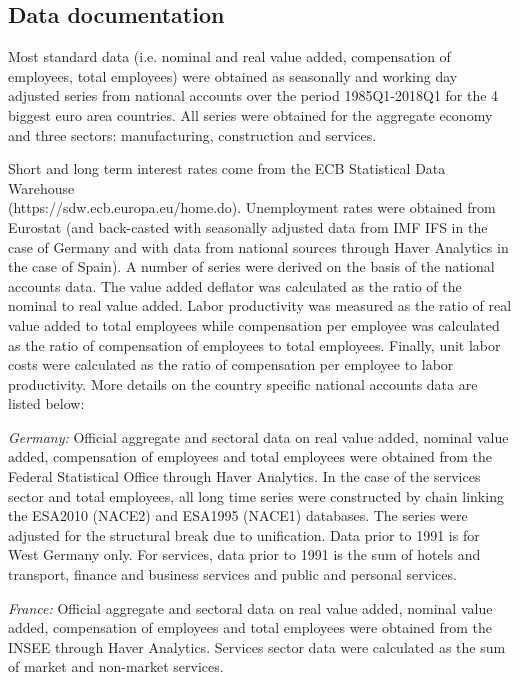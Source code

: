 \documentclass[11pt]{article}
\begin{document}
\begin{appendices}
\section{Data documentation} \label{DataAnnex}
Most standard data (i.e. nominal and real value added, compensation of employees, total employees) were obtained as seasonally and working day adjusted series from national accounts over the period 1985Q1-2018Q1 for the 4 biggest euro area countries. All series were obtained for the aggregate economy and three sectors: manufacturing, construction and services.

Short and long term interest rates come from the ECB Statistical Data Warehouse \\ (https://sdw.ecb.europa.eu/home.do). Unemployment rates were obtained from Eurostat (and back-casted with seasonally adjusted data from IMF IFS in the case of Germany and with data from national sources through Haver Analytics in the case of Spain). A number of series were derived on the basis of the national accounts data. The value added deflator was calculated as the ratio of the nominal to real value added. Labor productivity was measured as the ratio of real value added to total employees while compensation per employee was calculated as the ratio of compensation of employees to total employees.  Finally, unit labor costs were calculated as the ratio of compensation per employee to labor productivity. More details on the country specific national accounts data are listed below:

\textit{Germany:} Official aggregate and sectoral data on real value added, nominal value added, compensation of employees and total employees were obtained from the Federal Statistical Office through Haver Analytics. In the case of the services sector and total employees, all long time series were constructed by chain linking the ESA2010 (NACE2) and ESA1995 (NACE1) databases. The series were adjusted for the structural break due to unification. Data prior to 1991 is for West Germany only. For services, data prior to 1991 is the sum of hotels and transport, finance and business services and public and personal services.

\textit{France:} Official aggregate and sectoral data on real value added, nominal value added, compensation of employees and total employees were obtained from the INSEE through Haver Analytics. Services sector data were calculated as the sum of market and non-market services.


\end{appendices}
\end{document}
